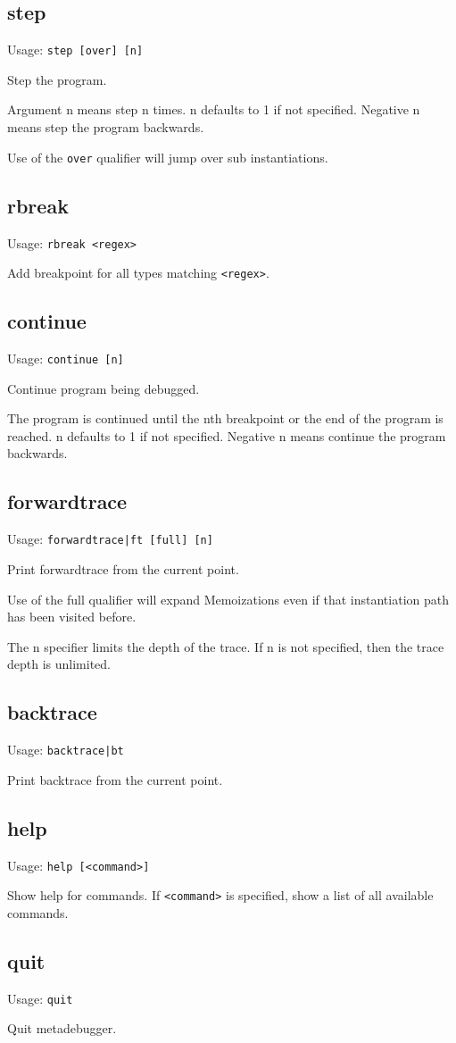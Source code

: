 \subsection*{step}

Usage: \lstinline$step [over] [n]$

Step the program.

Argument n means step n times. n defaults to 1 if not specified. Negative n
means step the program backwards.

Use of the \lstinline$over$ qualifier will jump over sub instantiations.

\subsection*{rbreak}

Usage: \lstinline$rbreak <regex>$

Add breakpoint for all types matching \lstinline$<regex>$.

\subsection*{continue}

Usage: \lstinline$continue [n]$

Continue program being debugged.

The program is continued until the nth breakpoint or the end of the program is
reached. n defaults to 1 if not specified. Negative n means continue the
program backwards.

\subsection*{forwardtrace}

Usage: \lstinline$forwardtrace|ft [full] [n]$

Print forwardtrace from the current point.

Use of the full qualifier will expand Memoizations even if that instantiation
path has been visited before.

The n specifier limits the depth of the trace. If n is not specified, then the
trace depth is unlimited.

\subsection*{backtrace}

Usage: \lstinline$backtrace|bt$

Print backtrace from the current point.

\subsection*{help}

Usage: \lstinline$help [<command>]$

Show help for commands.
If \lstinline$<command>$ is specified, show a list of all available commands.

\subsection*{quit}

Usage: \lstinline$quit$

Quit metadebugger.

